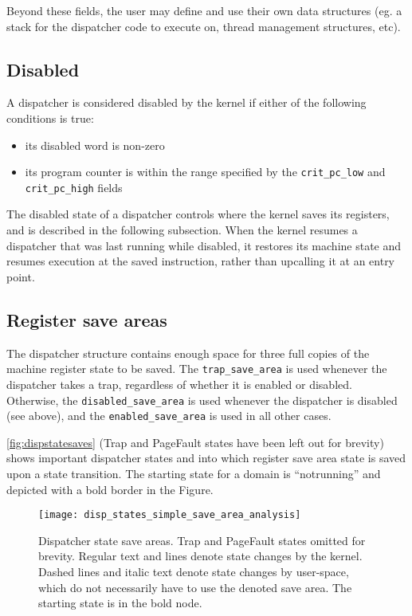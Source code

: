 \documentclass[a4paper,11pt,twoside]{report}
\begin{document}
Beyond these fields, the user may define and use their own data
structures (eg. a stack for the dispatcher code to execute on,
thread management structures, etc).

\subsection{Disabled}

A dispatcher is considered disabled by the kernel if either of the
following conditions is true:

\begin{itemize}
\item its disabled word is non-zero
\item its program counter is within the range specified by the
\lstinline+crit_pc_low+ and \lstinline+crit_pc_high+ fields
\end{itemize}

The disabled state of a dispatcher controls where the kernel saves
its registers, and is described in the following subsection. When
the kernel resumes a dispatcher that was last running while
disabled, it restores its machine state and resumes execution at the
saved instruction, rather than upcalling it at an entry point.

\subsection{Register save areas}

The dispatcher structure contains enough space for three full copies
of the machine register state to be saved. The \lstinline+trap_save_area+
is used whenever the dispatcher takes a trap, regardless of whether
it is enabled or disabled. Otherwise, the \lstinline+disabled_save_area+
is used whenever the dispatcher is disabled (see above), and the
\lstinline+enabled_save_area+ is used in all other cases.

\autoref{fig:dispstatesaves} (Trap and PageFault states have
been left out for brevity) shows important dispatcher states and into
which register save area state is saved upon a state transition. The
starting state for a domain is ``notrunning'' and depicted with a
bold border in the Figure.

\begin{figure}
\centering
\texttt{[image: disp\_states\_simple\_save\_area\_analysis]}
\caption[Dispatcher state save areas]{Dispatcher state save areas.
 Trap and PageFault states
 omitted for brevity. Regular text and lines denote state changes
 by the kernel. Dashed lines and italic text denote state changes
 by user-space, which do not necessarily have to use the denoted
 save area. The starting state is in the bold
 node.}\label{fig:dispstatesaves}
\end{figure}
\end{document}
